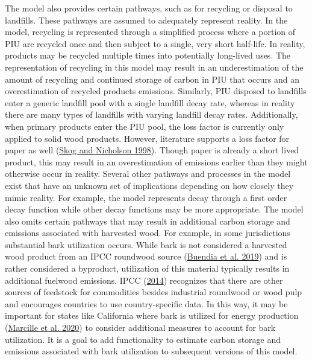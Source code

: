 \documentclass[
  openany]{book}
\begin{document}
The model also provides certain pathways, such as for recycling or
disposal to landfills. These pathways are assumed to adequately
represent reality. In the model, recycling is represented through a
simplified process where a portion of PIU are recycled once and then
subject to a single, very short half-life. In reality, products may be
recycled multiple times into potentially long-lived uses. The
representation of recycling in this model may result in an
underestimation of the amount of recycling and continued storage of
carbon in PIU that occurs and an overestimation of recycled products
emissions. Similarly, PIU disposed to landfills enter a generic landfill
pool with a single landfill decay rate, whereas in reality there are
many types of landfills with varying landfill decay rates. Additionally,
when primary products enter the PIU pool, the loss factor is currently
only applied to solid wood products. However, literature supports a loss
factor for paper as well (\protect\hyperlink{ref-skog1998}{Skog and
Nicholson 1998}). Though paper is already a short lived product, this
may result in an overestimation of emissions earlier than they might
otherwise occur in reality. Several other pathways and processes in the
model exist that have an unknown set of implications depending on how
closely they mimic reality. For example, the model represents decay
through a first order decay function while other decay functions may be
more appropriate. The model also omits certain pathways that may result
in additional carbon storage and emissions associated with harvested
wood. For example, in some jurisdictions substantial bark utilization
occurs. While bark is not considered a harvested wood product from an
IPCC roundwood source (\protect\hyperlink{ref-buendia2019}{Buendia et
al. 2019}) and is rather considered a byproduct, utilization of this
material typically results in additional fuelwood emissions. IPCC
(\protect\hyperlink{ref-ipcc2014}{2014}) recognizes that there are other
sources of feedstock for commodities besides industrial roundwood or
wood pulp and encourages countries to use country-specific data. In this
way, it may be important for states like California where bark is
utilized for energy production
(\protect\hyperlink{ref-marcille2020}{Marcille et al. 2020}) to consider
additional measures to account for bark utilization. It is a goal to add
functionality to estimate carbon storage and emissions associated with
bark utilization to subsequent versions of this model.
\end{document}
